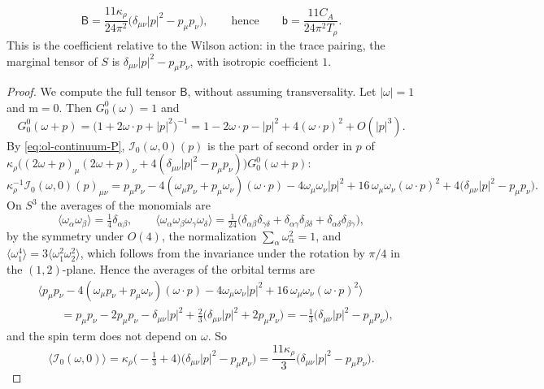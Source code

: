 \begin{lemma}\label{lem:ol-classical}
\[
\mathsf B=\frac{11\kappa_\rho}{24\pi^2}\big(\delta_{\mu\nu}|p|^2-p_\mu p_\nu\big),\qquad\text{hence}\qquad\mathsf b=\frac{11C_A}{24\pi^2T_\rho}.
\]
This is the coefficient relative to the Wilson action: in the trace pairing, the marginal tensor of $S$ is $\delta_{\mu\nu}|p|^2-p_\mu p_\nu$, with isotropic coefficient $1$.
\end{lemma}

\begin{proof}
We compute the full tensor $\mathsf B$, without assuming transversality. Let $|\omega|=1$ and $\mathrm m=0$. Then $G^0_0(\omega)=1$ and
\[
G^0_0(\omega+p)=\big(1+2\omega\cdot p+|p|^2\big)^{-1}=1-2\omega\cdot p-|p|^2+4(\omega\cdot p)^2+O(|p|^3).
\]
By \eqref{eq:ol-continuum-P}, $\mathcal I_0(\omega,0)(p)$ is the part of second order in $p$ of $\kappa_\rho\big((2\omega+p)_\mu(2\omega+p)_\nu+4(\delta_{\mu\nu}|p|^2-p_\mu p_\nu)\big)G^0_0(\omega+p)$:
\[
\kappa_\rho^{-1}\mathcal I_0(\omega,0)(p)_{\mu\nu}=p_\mu p_\nu-4(\omega_\mu p_\nu+p_\mu\omega_\nu)(\omega\cdot p)-4\omega_\mu\omega_\nu|p|^2+16\,\omega_\mu\omega_\nu(\omega\cdot p)^2+4\big(\delta_{\mu\nu}|p|^2-p_\mu p_\nu\big).
\]
On $S^3$ the averages of the monomials are
\begin{equation}\label{eq:ol-sphere-moments}
\langle\omega_\alpha\omega_\beta\rangle=\tfrac14\delta_{\alpha\beta},\qquad\langle\omega_\alpha\omega_\beta\omega_\gamma\omega_\delta\rangle=\tfrac1{24}\big(\delta_{\alpha\beta}\delta_{\gamma\delta}+\delta_{\alpha\gamma}\delta_{\beta\delta}+\delta_{\alpha\delta}\delta_{\beta\gamma}\big),
\end{equation}
by the symmetry under $O(4)$, the normalization $\sum_\alpha\omega_\alpha^2=1$, and $\langle\omega_1^4\rangle=3\langle\omega_1^2\omega_2^2\rangle$, which follows from the invariance under the rotation by $\pi/4$ in the $(1,2)$-plane. Hence the averages of the orbital terms are
\[
\begin{aligned}
&\big\langle p_\mu p_\nu-4(\omega_\mu p_\nu+p_\mu\omega_\nu)(\omega\cdot p)-4\omega_\mu\omega_\nu|p|^2+16\,\omega_\mu\omega_\nu(\omega\cdot p)^2\big\rangle\\
&\qquad=p_\mu p_\nu-2p_\mu p_\nu-\delta_{\mu\nu}|p|^2+\tfrac23\big(\delta_{\mu\nu}|p|^2+2p_\mu p_\nu\big)=-\tfrac13\big(\delta_{\mu\nu}|p|^2-p_\mu p_\nu\big),
\end{aligned}
\]
and the spin term does not depend on $\omega$. So
\[
\big\langle\mathcal I_0(\omega,0)\big\rangle=\kappa_\rho\big(-\tfrac13+4\big)\big(\delta_{\mu\nu}|p|^2-p_\mu p_\nu\big)=\frac{11\kappa_\rho}3\big(\delta_{\mu\nu}|p|^2-p_\mu p_\nu\big).
\]
\end{proof}
